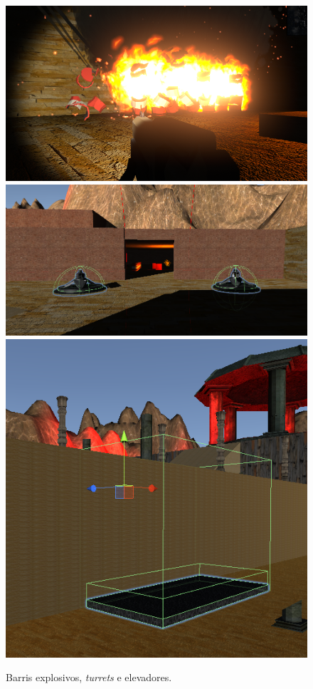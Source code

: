 \documentclass{article}
\begin{document}
        \begin{figure}[h]\begin{center}
            \includegraphics[scale=0.3]{Screenshot_4.png}
            \includegraphics[scale=0.25]{Screenshot_5.png}
            \includegraphics[scale=0.23]{Screenshot_6.png}
            \caption{Barris explosivos, \textit{turrets} e elevadores.}
        \end{center}\end{figure}
\end{document}
